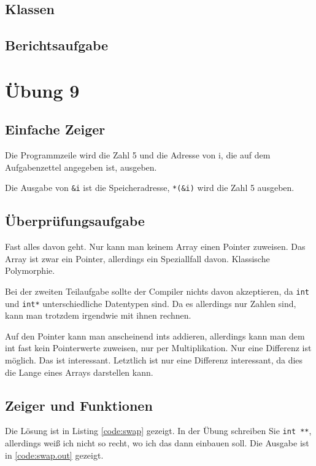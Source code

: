 
\section{Klassen}


\section{Berichtsaufgabe}


\chapter{Übung 9}

\section{Einfache Zeiger}

Die Programmzeile wird die Zahl 5 und die Adresse von i, die auf dem Aufgabenzettel angegeben ist, ausgeben.

Die Ausgabe von \verb#&i# ist die Speicheradresse, \verb#*(&i)# wird die Zahl 5 ausgeben.

\section{Überprüfungsaufgabe}

Fast alles davon geht. Nur kann man keinem Array einen Pointer zuweisen. Das Array ist zwar ein Pointer, allerdings ein Speziallfall davon. Klassische Polymorphie.

Bei der zweiten Teilaufgabe sollte der Compiler nichts davon akzeptieren, da \texttt{int} und \texttt{int*} unterschiedliche Datentypen sind. Da es allerdings nur Zahlen sind, kann man trotzdem irgendwie mit ihnen rechnen.

Auf den Pointer kann man anscheinend ints addieren, allerdings kann man dem int fast kein Pointerwerte zuweisen, nur per Multiplikation. Nur eine Differenz ist möglich. Das ist interessant. Letztlich ist nur eine Differenz interessant, da dies die Lange eines Arrays darstellen kann.

\section{Zeiger und Funktionen}

Die Lösung ist in Listing \ref{code:swap} gezeigt. In der Übung schreiben Sie \texttt{int **}, allerdings weiß ich nicht so recht, wo ich das dann einbauen soll. Die Ausgabe ist in \ref{code:swap.out} gezeigt.

